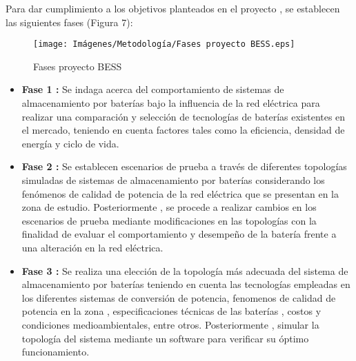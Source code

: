 Para dar cumplimiento a los objetivos planteados en el proyecto , se establecen  las siguientes fases  (Figura 7):

\begin{figure}[h!]
    \begin{center}
    \centering
    \texttt{[image: Imágenes/Metodología/Fases proyecto BESS.eps]}
	\caption{Fases proyecto BESS}
    \end{center}
\end{figure}



\begin{itemize}
    \item 
    \textbf{Fase 1 :} Se indaga acerca del comportamiento  de sistemas de almacenamiento por baterías bajo la influencia de la red eléctrica 
    para realizar una comparación y selección de tecnologías de baterías existentes en el mercado, teniendo en cuenta factores tales como la eficiencia, densidad de energía y ciclo de vida.
    \item 
   \textbf{Fase 2 : }Se establecen escenarios de prueba a través de diferentes topologías simuladas de sistemas de almacenamiento por baterías considerando los fenómenos de calidad de potencia de la red eléctrica que se presentan en la zona de estudio. Posteriormente , se procede a realizar cambios en los escenarios de prueba mediante modificaciones en las topologías con la finalidad de evaluar el comportamiento y desempeño de la batería frente a una alteración en la red eléctrica.
\newpage    
    \item 
    \textbf{Fase 3 : } Se realiza una  elección de la topología más adecuada del sistema de almacenamiento por baterías teniendo en cuenta las tecnologías empleadas en los diferentes sistemas de conversión de potencia, fenomenos de calidad de potencia en la zona , especificaciones técnicas de las baterías , costos  y condiciones medioambientales, entre otros. Posteriormente , simular la topología del sistema mediante un software para verificar su óptimo funcionamiento.
\end{itemize}

